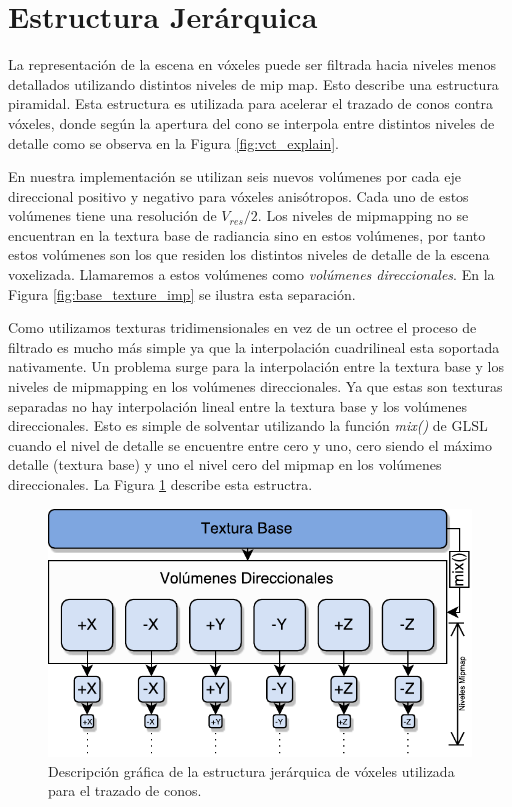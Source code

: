 \section{Estructura Jerárquica} %
\label{sec:estructura_jerarquica_impl}
La representación de la escena en vóxeles puede ser filtrada hacia niveles menos detallados utilizando distintos niveles de mip map. Esto describe una estructura piramidal. Esta estructura es utilizada para acelerar el trazado de conos contra vóxeles, donde según la apertura del cono se interpola entre distintos niveles de detalle como se observa en la Figura \ref{fig:vct_explain}.

En nuestra implementación se utilizan seis nuevos volúmenes por cada eje direccional positivo y negativo para vóxeles anisótropos. Cada uno de estos volúmenes tiene una resolución de $V_{res}/{2}$. Los niveles de mipmapping no se encuentran en la textura base de radiancia sino en estos volúmenes, por tanto estos volúmenes son los que residen los distintos niveles de detalle de la escena voxelizada. Llamaremos a estos volúmenes como \emph{volúmenes direccionales}. En la Figura \ref{fig:base_texture_imp} se ilustra esta separación.

Como utilizamos texturas tridimensionales en vez de un octree el proceso de filtrado es mucho más simple ya que la interpolación cuadrilineal esta soportada nativamente. Un problema surge para la interpolación entre la textura base y los niveles de mipmapping en los volúmenes direccionales. Ya que estas son texturas separadas no hay interpolación lineal entre la textura base y los volúmenes direccionales. Esto es simple de solventar utilizando la función \emph{mix()} de GLSL cuando el nivel de detalle se encuentre entre cero y uno, cero siendo el máximo detalle (textura base) y uno el nivel cero del mipmap en los volúmenes direccionales. La Figura \ref{fig:hierarchy_impl} describe esta estructra.

\begin{figure}[H]
    \centering
    \includegraphics[width=.8\linewidth]{media/hierarchy.pdf}
    \caption{Descripción gráfica de la estructura jerárquica de vóxeles utilizada para el trazado de conos.}
    \label{fig:hierarchy_impl}
\end{figure}

